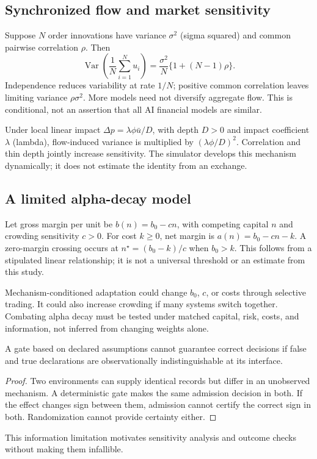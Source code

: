 \subsection{Synchronized flow and market sensitivity}
Suppose $N$ order innovations have variance $\sigma^2$ (sigma squared) and common pairwise correlation $\rho$. Then
\begin{equation}
\operatorname{Var}\!\left(\frac1N\sum_{i=1}^N u_i\right)
=\frac{\sigma^2}{N}\{1+(N-1)\rho\}.
\label{eq:correlation}
\end{equation}
Independence reduces variability at rate $1/N$; positive common correlation leaves limiting variance $\rho\sigma^2$. More models need not diversify aggregate flow. This is conditional, not an assertion that all AI financial models are similar.

Under local linear impact $\Delta p=\lambda\phi\bar u/D$, with depth $D>0$ and impact coefficient $\lambda$ (lambda), flow-induced variance is multiplied by $(\lambda\phi/D)^2$. Correlation and thin depth jointly increase sensitivity. The simulator develops this mechanism dynamically; it does not estimate the identity from an exchange.

\subsection{A limited alpha-decay model}
Let gross margin per unit be $b(n)=b_0-cn$, with competing capital $n$ and crowding sensitivity $c>0$. For cost $k\ge0$, net margin is $a(n)=b_0-cn-k$. A zero-margin crossing occurs at $n^\star=(b_0-k)/c$ when $b_0>k$. This follows from a stipulated linear relationship; it is not a universal threshold or an estimate from this study.

Mechanism-conditioned adaptation could change $b_0$, $c$, or costs through selective trading. It could also increase crowding if many systems switch together. Combating alpha decay must be tested under matched capital, risk, costs, and information, not inferred from changing weights alone.

\begin{proposition}
A gate based on declared assumptions cannot guarantee correct decisions if false and true declarations are observationally indistinguishable at its interface.
\end{proposition}
\begin{proof}
Two environments can supply identical records but differ in an unobserved mechanism. A deterministic gate makes the same admission decision in both. If the effect changes sign between them, admission cannot certify the correct sign in both. Randomization cannot provide certainty either.
\end{proof}
This information limitation motivates sensitivity analysis and outcome checks without making them infallible.

